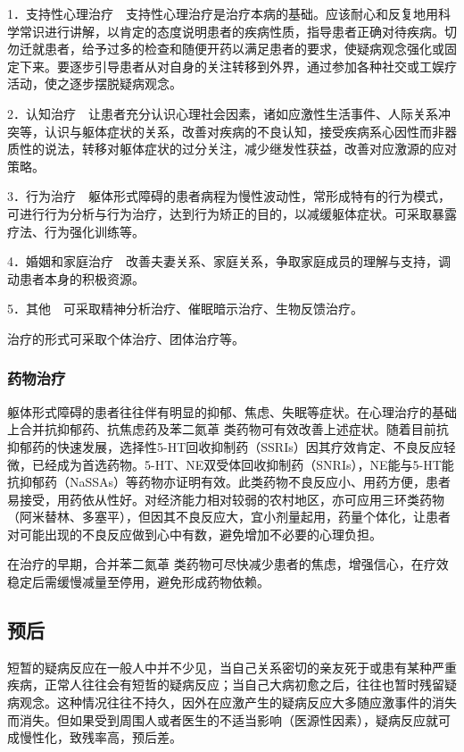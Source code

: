 1．支持性心理治疗　支持性心理治疗是治疗本病的基础。应该耐心和反复地用科学常识进行讲解，以肯定的态度说明患者的疾病性质，指导患者正确对待疾病。切勿迁就患者，给予过多的检查和随便开药以满足患者的要求，使疑病观念强化或固定下来。要逐步引导患者从对自身的关注转移到外界，通过参加各种社交或工娱疗活动，使之逐步摆脱疑病观念。

2．认知治疗　让患者充分认识心理社会因素，诸如应激性生活事件、人际关系冲突等，认识与躯体症状的关系，改善对疾病的不良认知，接受疾病系心因性而非器质性的说法，转移对躯体症状的过分关注，减少继发性获益，改善对应激源的应对策略。

3．行为治疗　躯体形式障碍的患者病程为慢性波动性，常形成特有的行为模式，可进行行为分析与行为治疗，达到行为矫正的目的，以减缓躯体症状。可采取暴露疗法、行为强化训练等。

4．婚姻和家庭治疗　改善夫妻关系、家庭关系，争取家庭成员的理解与支持，调动患者本身的积极资源。

5．其他　可采取精神分析治疗、催眠暗示治疗、生物反馈治疗。

治疗的形式可采取个体治疗、团体治疗等。

\subsubsection{药物治疗}

躯体形式障碍的患者往往伴有明显的抑郁、焦虑、失眠等症状。在心理治疗的基础上合并抗抑郁药、抗焦虑药及苯二氮䓬
类药物可有效改善上述症状。随着目前抗抑郁药的快速发展，选择性5-HT回收抑制药（SSRIs）因其疗效肯定、不良反应轻微，已经成为首选药物。5-HT、NE双受体回收抑制药（SNRIs），NE能与5-HT能抗抑郁药（NaSSAs）等药物亦证明有效。此类药物不良反应小、用药方便，患者易接受，用药依从性好。对经济能力相对较弱的农村地区，亦可应用三环类药物（阿米替林、多塞平），但因其不良反应大，宜小剂量起用，药量个体化，让患者对可能出现的不良反应做到心中有数，避免增加不必要的心理负担。

在治疗的早期，合并苯二氮䓬
类药物可尽快减少患者的焦虑，增强信心，在疗效稳定后需缓慢减量至停用，避免形成药物依赖。

\subsection{预后}

短暂的疑病反应在一般人中并不少见，当自己关系密切的亲友死于或患有某种严重疾病，正常人往往会有短哲的疑病反应；当自己大病初愈之后，往往也暂时残留疑病观念。这种情况往往不持久，因外在应激产生的疑病反应大多随应激事件的消失而消失。但如果受到周围人或者医生的不适当影响（医源性因素），疑病反应就可成慢性化，致残率高，预后差。

